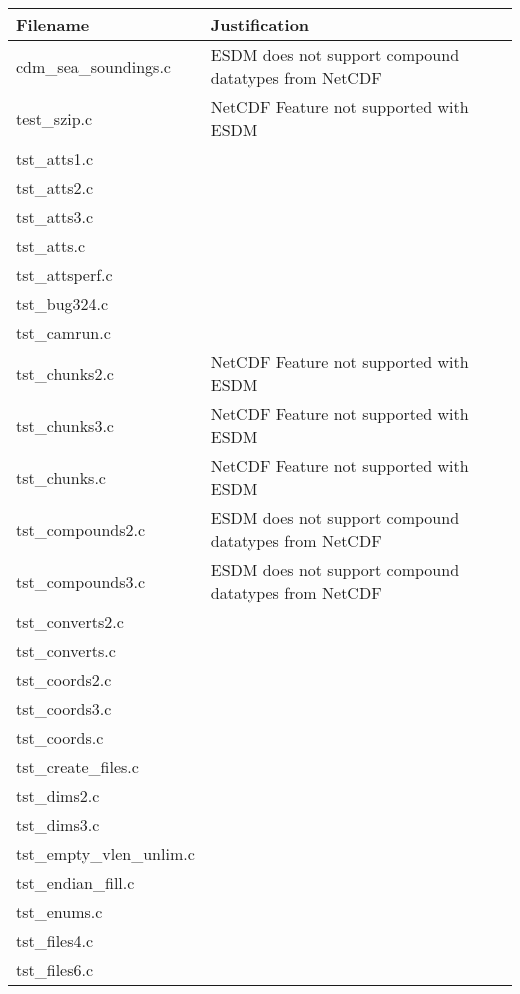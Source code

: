 \begin{table}[H]
\centering
\begin{tabular}{|l|l|}
\hline
Filename & Justification \\ \hline \hline
cdm\_sea\_soundings.c   & ESDM does not support compound datatypes from NetCDF          \\ \hline
test\_szip.c   &  NetCDF Feature not supported with ESDM         \\ \hline
tst\_atts1.c   &           \\ \hline
tst\_atts2.c   &           \\ \hline
tst\_atts3.c   &           \\ \hline
tst\_atts.c   &           \\ \hline
tst\_attsperf.c   &           \\ \hline
tst\_bug324.c   &           \\ \hline
tst\_camrun.c   &           \\ \hline
tst\_chunks2.c   &  NetCDF Feature not supported with ESDM         \\ \hline
tst\_chunks3.c   &  NetCDF Feature not supported with ESDM         \\ \hline
tst\_chunks.c   &  NetCDF Feature not supported with ESDM         \\ \hline
tst\_compounds2.c   &  ESDM does not support compound datatypes from NetCDF         \\ \hline
tst\_compounds3.c   &  ESDM does not support compound datatypes from NetCDF         \\ \hline
tst\_converts2.c   &           \\ \hline
tst\_converts.c   &           \\ \hline
tst\_coords2.c   &           \\ \hline
tst\_coords3.c   &           \\ \hline
tst\_coords.c   &           \\ \hline
tst\_create\_files.c   &           \\ \hline
tst\_dims2.c   &       \\ \hline
tst\_dims3.c   &       \\ \hline
tst\_empty\_vlen\_unlim.c   &       \\ \hline
tst\_endian\_fill.c   &       \\ \hline
tst\_enums.c   &       \\ \hline
tst\_files4.c   &       \\ \hline
tst\_files6.c   &       \\ \hline

\end{tabular}
\end{table}
